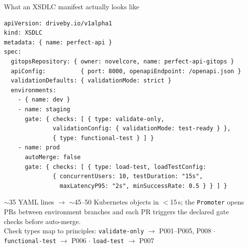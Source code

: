 \documentclass[11pt,aspectratio=169]{beamer}
\begin{document}
\begin{frame}[fragile]{What an XSDLC manifest actually looks like}

\vspace{0.1em}
\begin{lstlisting}
apiVersion: driveby.io/v1alpha1
kind: XSDLC
metadata: { name: perfect-api }
spec:
  gitopsRepository: { owner: novelcore, name: perfect-api-gitops }
  apiConfig:          { port: 8000, openapiEndpoint: /openapi.json }
  validationDefaults: { validationMode: strict }
  environments:
    - { name: dev }
    - name: staging
      gate: { checks: [ { type: validate-only,
              validationConfig: { validationMode: test-ready } },
              { type: functional-test } ] }
    - name: prod
      autoMerge: false
      gate: { checks: [ { type: load-test, loadTestConfig:
              { concurrentUsers: 10, testDuration: "15s",
                maxLatencyP95: "2s", minSuccessRate: 0.5 } } ] }
\end{lstlisting}

\vspace{0.15em}
\scriptsize
$\sim$35 YAML lines $\to$ $\sim$45--50 Kubernetes objects in $<$15\,s; the
\texttt{Promoter} opens PRs between environment branches and each PR triggers the
declared gate checks before auto-merge.\\[0.2em]
\alert{Check types map to principles:}\quad
\texttt{validate-only} $\to$ P001--P005, P008 \;$\cdot$\;
\texttt{functional-test} $\to$ P006 \;$\cdot$\;
\texttt{load-test} $\to$ P007

\end{frame}
\end{document}
